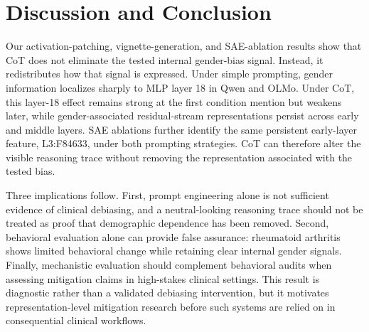 \documentclass{article}
\begin{document}
\section{Discussion and Conclusion}
Our activation-patching, vignette-generation, and SAE-ablation results show that CoT does not eliminate the tested internal gender-bias signal. Instead, it redistributes how that signal is expressed. Under simple prompting, gender information localizes sharply to MLP layer 18 in Qwen and OLMo. Under CoT, this layer-18 effect remains strong at the first condition mention but weakens later, while gender-associated residual-stream representations persist across early and middle layers. SAE ablations further identify the same persistent early-layer feature, L3:F84633, under both prompting strategies. CoT can therefore alter the visible reasoning trace without removing the representation associated with the tested bias.

Three implications follow. First, prompt engineering alone is not sufficient evidence of clinical debiasing, and a neutral-looking reasoning trace should not be treated as proof that demographic dependence has been removed. Second, behavioral evaluation alone can provide false assurance: rheumatoid arthritis shows limited behavioral change while retaining clear internal gender signals. Finally, mechanistic evaluation should complement behavioral audits when assessing mitigation claims in high-stakes clinical settings. This result is diagnostic rather than a validated debiasing intervention, but it motivates representation-level mitigation research before such systems are relied on in consequential clinical workflows.
\end{document}
